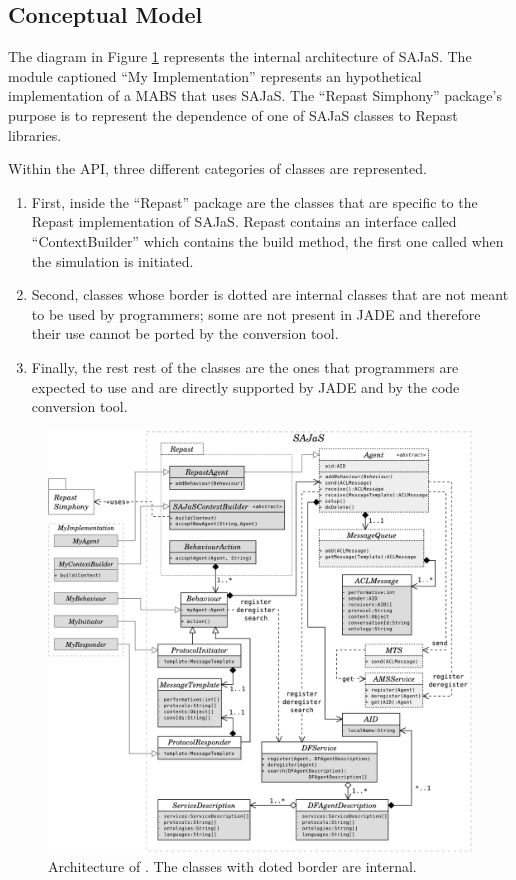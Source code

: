 \subsection{Conceptual Model}
\label{sec:arch_conceptual}
The diagram in Figure \ref{fig:arch} represents the internal architecture of SAJaS. The module captioned ``My Implementation'' represents an hypothetical implementation of a MABS that uses SAJaS. The ``Repast Simphony'' package's purpose is to represent the dependence of one of SAJaS classes to Repast libraries.

Within the API, three different categories of classes are represented.

\begin{enumerate}
	\item First, inside the ``Repast'' package are the classes that are specific to the Repast implementation of SAJaS. Repast contains an interface called ``ContextBuilder'' which contains the build method, the first one called when the simulation is initiated.
	\item Second, classes whose border is dotted are internal classes that are not meant to be used by programmers; some are not present in JADE and therefore their use cannot be ported by the conversion tool.
	\item Finally, the rest rest of the classes are the ones that programmers are expected to use and are directly supported by JADE and by the code conversion tool.
\end{enumerate}




\begin{figure}[h]
	\centering
	\includegraphics[width=\linewidth]{figures/sajas_arch.pdf}
	\caption[\apiname{}'s architecture]{Architecture of \apiname{}. The classes with doted border are internal.}
	\label{fig:arch}
\end{figure}

